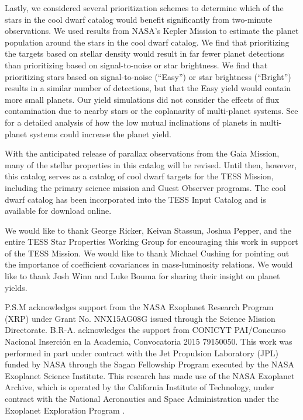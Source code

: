 \documentclass[twocolumn]{aastex62}
\begin{document}
Lastly, we considered several prioritization schemes to determine which of the stars in the cool dwarf catalog would benefit significantly from two-minute observations.  We used results from NASA's Kepler Mission to estimate the planet population around the stars in the cool dwarf catalog.  We find that prioritizing the targets based on stellar density would result in far fewer planet detections than prioritizing based on signal-to-noise or star brightness.  We find that prioritizing stars based on signal-to-noise (``Easy'') or star brightness (``Bright'') results in a similar number of detections, but that the Easy yield would contain more small planets.  Our yield simulations did not consider the effects of flux contamination due to nearby stars or the coplanarity of multi-planet systems. See \citet{Ballard2018} for a detailed analysis of how the low mutual inclinations of planets in multi-planet systems could increase the planet yield.

With the anticipated release of parallax observations from the Gaia Mission, many of the stellar properties in this catalog will be revised.  Until then, however, this catalog serves as a catalog of cool dwarf targets for the TESS Mission, including the primary science mission and Guest Observer programs.  The cool dwarf catalog has been incorporated into the TESS Input Catalog and is available for download online.


\acknowledgements

We would like to thank George Ricker, Keivan Stassun, Joshua Pepper, and the entire TESS Star Properties Working Group for encouraging this work in support of the TESS Mission.  We would like to thank Michael Cushing for pointing out the importance of coefficient covariances in mass-luminosity relations.  We would like to thank Josh Winn and Luke Bouma for sharing their insight on planet yields.

P.S.M acknowledges support from the NASA Exoplanet Research Program (XRP) under Grant No. NNX15AG08G issued through the Science Mission Directorate.  B.R-A. acknowledges the support from CONICYT PAI/Concurso Nacional Inserci{\'o}n en la Academia, Convocatoria 2015 79150050.  This work was performed in part under contract with the Jet Propulsion Laboratory (JPL) funded by NASA through the Sagan Fellowship Program executed by the NASA Exoplanet Science Institute.  This research has made use of the NASA Exoplanet Archive, which is operated by the California Institute of Technology, under contract with the National Aeronautics and Space Administration under the Exoplanet Exploration Program \citep[][]{Akeson2013}.
\end{document}
